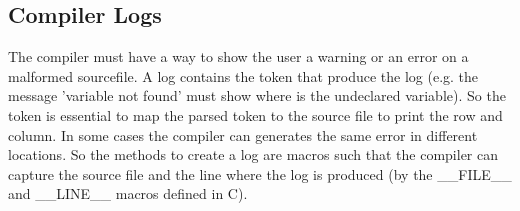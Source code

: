 
\subsection{Compiler Logs}
The compiler must have a way to show the user a warning or an error on a malformed sourcefile.
A log contains the token that produce the log (e.g. the message 'variable not found' must show where is the undeclared variable).
So the token is essential to map the parsed token to the source file to print the row and column.
In some cases the compiler can generates the same error in different locations. So the methods to create a log are macros such that the compiler can capture the source file and the line where the log is produced (by the \_\_FILE\_\_ and \_\_LINE\_\_ macros defined in C).

